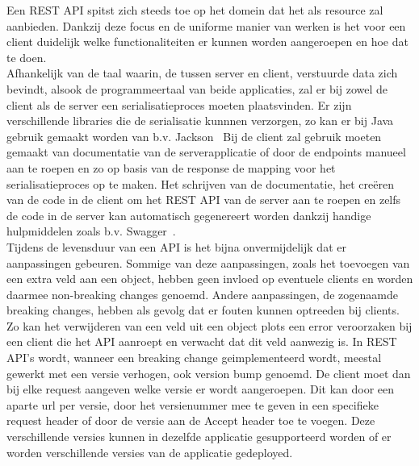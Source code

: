 Een REST API spitst zich steeds toe op het domein dat het als resource zal aanbieden.
Dankzij deze focus en de uniforme manier van werken is het voor een client duidelijk welke functionaliteiten er kunnen worden aangeroepen en hoe dat te doen.
~\autocite{jscrambler}
~\autocite{hubspot}
~\autocite{HTTP1.1vsHTTP2}\\

Afhankelijk van de taal waarin, de tussen server en client, verstuurde data zich bevindt, alsook de programmeertaal van beide applicaties,
zal er bij zowel de client als de server een serialisatieproces moeten plaatsvinden. Er zijn verschillende libraries die de serialisatie kunnnen verzorgen,
zo kan er bij Java gebruik gemaakt worden van b.v. Jackson~\parencite{jackson} \newline
Bij de client zal gebruik moeten gemaakt van documentatie van de serverapplicatie of door de endpoints manueel aan te roepen
en zo op basis van de response de mapping voor het serialisatieproces op te maken. Het schrijven van de documentatie,
het creëren van de code in de client om het REST API van de server aan te roepen en zelfs de code in de server kan automatisch gegenereert worden dankzij
handige hulpmiddelen zoals b.v. Swagger~\parencite{swagger}.\\

Tijdens de levensduur van een API is het bijna onvermijdelijk dat er aanpassingen gebeuren. Sommige van deze aanpassingen, zoals het toevoegen van een extra veld aan een object,
hebben geen invloed op eventuele clients en worden daarmee non-breaking changes genoemd. Andere aanpassingen, de zogenaamde breaking changes, hebben als gevolg dat er
fouten kunnen optreeden bij clients. Zo kan het verwijderen van een veld uit een object plots een error veroorzaken bij
een client die het API aanroept en verwacht dat dit veld aanwezig is. In REST API's wordt, wanneer een breaking change geimplementeerd wordt,
meestal gewerkt met een versie verhogen, ook version bump genoemd. De client moet dan bij elke request aangeven welke versie er wordt aangeroepen.
Dit kan door een aparte url per versie, door het versienummer mee te geven in een specifieke request header of door de versie aan de Accept header toe te voegen.
Deze verschillende versies kunnen in dezelfde applicatie gesupporteerd worden of er worden verschillende versies van de applicatie gedeployed.
~\autocite{restversion}\\

